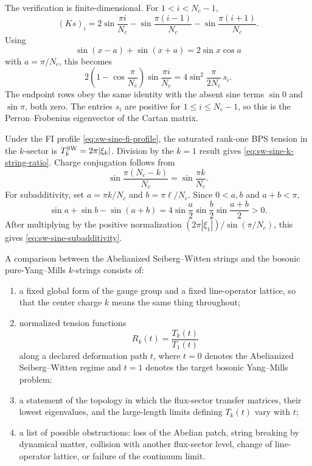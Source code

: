 The verification is finite-dimensional.  For \(1<i<N_c-1\),
\[
  (Ks)_i
  =
  2\sin\frac{\pi i}{N_c}
  -\sin\frac{\pi(i-1)}{N_c}
  -\sin\frac{\pi(i+1)}{N_c}.
\]
Using
\[
  \sin(x-a)+\sin(x+a)=2\sin x\cos a
\]
with \(a=\pi/N_c\), this becomes
\[
  2\left(1-\cos\frac{\pi}{N_c}\right)
  \sin\frac{\pi i}{N_c}
  =
  4\sin^2\frac{\pi}{2N_c}\,s_i .
\]
The endpoint rows obey the same identity with the absent sine terms
\(\sin0\) and \(\sin\pi\), both zero.  The entries \(s_i\) are positive for
\(1\le i\le N_c-1\), so this is the Perron--Frobenius eigenvector of the
Cartan matrix.

Under the FI profile \eqref{eq:sw-sine-fi-profile}, the saturated rank-one
BPS tension in the \(k\)-sector is \(T_k^{\rm SW}=2\pi|\xi_k|\).  Division by
the \(k=1\) result gives \eqref{eq:sw-sine-k-string-ratio}.  Charge
conjugation follows from
\[
  \sin\frac{\pi(N_c-k)}{N_c}
  =
  \sin\frac{\pi k}{N_c}.
\]
For subadditivity, set \(a=\pi k/N_c\) and \(b=\pi\ell/N_c\).  Since
\(0<a,b\) and \(a+b<\pi\),
\[
  \sin a+\sin b-\sin(a+b)
  =
  4\sin\frac a2\sin\frac b2\sin\frac{a+b}{2}>0 .
\]
After multiplying by the positive normalization
\((2\pi|\xi_1|)/\sin(\pi/N_c)\), this gives
\eqref{eq:sw-sine-subadditivity}.

\begin{definition}
\label{def:sw-to-pure-ym-string-comparison}
A comparison between the Abelianized Seiberg--Witten strings and the bosonic
pure-Yang--Mills \(k\)-strings consists of:
\begin{enumerate}[label=(\roman*)]
\item a fixed global form of the gauge group and a fixed line-operator
  lattice, so that the center charge \(k\) means the same thing throughout;
\item normalized tension functions
  \[
    R_k(t)=\frac{T_k(t)}{T_1(t)}
  \]
  along a declared deformation path \(t\), where \(t=0\) denotes the
  Abelianized Seiberg--Witten regime and \(t=1\) denotes the target bosonic
  Yang--Mills problem;
\item a statement of the topology in which the flux-sector transfer matrices,
  their lowest eigenvalues, and the large-length limits defining \(T_k(t)\)
  vary with \(t\);
\item a list of possible obstructions: loss of the Abelian patch, string
  breaking by dynamical matter, collision with another flux-sector level,
  change of line-operator lattice, or failure of the continuum limit.
\end{enumerate}
\end{definition}

